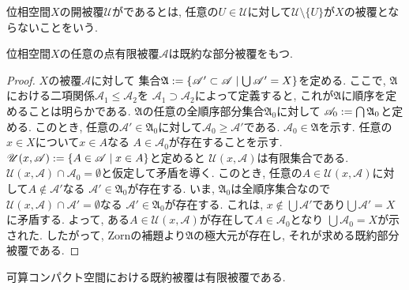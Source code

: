 \documentclass[uplatex, dvipdfmx, a4paper, 12pt, class=jsbook, crop=false]{standalone}
\begin{document}
\begin{definition}
	位相空間$ X $の開被覆$ \mathscr{U} $がであるとは, 
	任意の$ U \in \mathscr{U} $に対して$ \mathscr{U} \setminus \{U\} $が$ X $の被覆とならないことをいう.
\end{definition}

\begin{proposition}
	\label{prop:Every point finite cover A of X has an irreducible subcover}
	位相空間$ X $の任意の点有限被覆$ \mathscr{A} $は既約な部分被覆をもつ.
\end{proposition}

\begin{proof}
	$ X $の被覆$ \mathscr{A} $に対して
	集合$ \mathfrak{A} \defeq \setcomp{\mathscr{A}' \subset \mathscr{A}}{\bigcup \mathscr{A}' = X} $を定める. 
	ここで, $ \mathfrak{A} $における二項関係$ \mathscr{A}_1 \leq \mathscr{A}_2 $を
	$ \mathscr{A}_1 \supset \mathscr{A}_2 $によって定義すると, 
	これが$ \mathfrak{A} $に順序を定めることは明らかである. 
	$ \mathfrak{A} $の任意の全順序部分集合$ \mathfrak{A}_0 $に対して
	$ \mathscr{A}_0 \mathrel{:=} \bigcap \mathfrak{A}_0 $と定める. 
	このとき, 任意の$ \mathscr{A}' \in \mathfrak{A}_0 $に対して$ \mathscr{A}_0 \geq \mathscr{A}' $である. 
	$ \mathscr{A}_0 \in \mathfrak{A} $を示す. 任意の$ x \in X $について$ x \in A $なる
	$ A \in \mathscr{A}_0 $が存在することを示す. 
	$ \mathscr{U}(x, \mathscr{A}) \defeq \setcomp{A \in \mathscr{A}}{x \in A} $と定めると
	$ \mathscr{U}(x, \mathscr{A}) $は有限集合である. 
	$ \mathscr{U}(x, \mathscr{A}) \cap \mathscr{A}_0 = \emptyset $と仮定して矛盾を導く. 
	このとき, 任意の$ A \in \mathscr{U}(x, \mathscr{A}) $に対して$ A \notin \mathscr{A}' $なる
	$ \mathscr{A}' \in \mathfrak{A}_0 $が存在する. 
	いま, $ \mathfrak{A}_0 $は全順序集合なので
	$ \mathscr{U}(x, \mathscr{A}) \cap \mathscr{A}' = \emptyset $なる
	$ \mathscr{A}' \in \mathfrak{A}_0 $が存在する. 
	これは, $ x \notin \bigcup \mathscr{A}' $であり$ \bigcup \mathscr{A}' = X $に矛盾する. 
	よって, ある$ A \in \mathscr{U}(x, \mathscr{A}) $が存在して$ A \in \mathscr{A}_0 $となり
	$ \bigcup \mathscr{A}_0 = X $が示された. したがって, Zornの補題より$ \mathfrak{A} $の極大元が存在し, 
	それが求める既約部分被覆である.
\end{proof}

\begin{proposition}
	\label{prop:Irreducible cover in a CntCpt space is a finite cover}
	可算コンパクト空間における既約被覆は有限被覆である.
\end{proposition}
\end{document}
